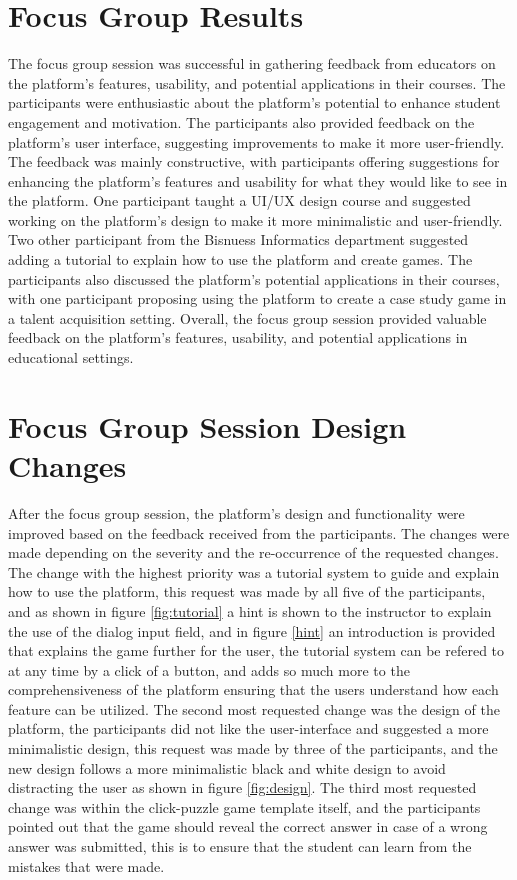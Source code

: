 \section{Focus Group Results}

The focus group session was successful in gathering feedback from educators on the platform's features, usability, and potential applications in their courses. The participants were enthusiastic about the platform's potential to enhance student engagement and motivation. The participants also provided feedback on the platform's user interface, suggesting improvements to make it more user-friendly. The feedback was mainly constructive, with participants offering suggestions for enhancing the platform's features and usability for what they would like to see in the platform. One participant taught a UI/UX design course and suggested working on the platform's design to make it more minimalistic and user-friendly. Two other participant from the Bisnuess Informatics department suggested adding a tutorial to explain how to use the platform and create games. The participants also discussed the platform's potential applications in their courses, with one participant proposing using the platform to create a case study game in a talent acquisition setting. Overall, the focus group session provided valuable feedback on the platform's features, usability, and potential applications in educational settings.

\section{Focus Group Session Design Changes}

After the focus group session, the platform's design and functionality were improved based on the feedback received from the participants. The changes were made depending on the severity and the re-occurrence of the requested changes. The change with the highest priority was a tutorial system to guide and explain how to use the platform, this request was made by all five of the participants, and as shown in figure \ref{fig:tutorial} a hint is shown to the instructor to explain the use of the dialog input field, and in figure \ref{hint} an introduction is provided that explains the game further for the user, the tutorial system can be refered to at any time by a click of a button, and adds so much more to the comprehensiveness of the platform ensuring that the users understand how each feature can be utilized. The second most requested change was the design of the platform, the participants did not like the user-interface and suggested a more minimalistic design, this request was made by three of the participants, and the new design follows a more minimalistic black and white design to avoid distracting the user as shown in figure \ref{fig:design}. The third most requested change was within the click-puzzle game template itself, and the participants pointed out that the game should reveal the correct answer in case of a wrong answer was submitted, this is to ensure that the student can learn from the mistakes that were made.

